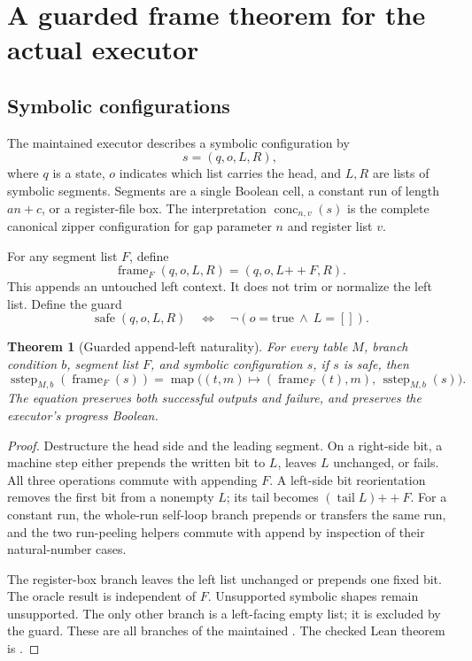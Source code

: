\documentclass[11pt,letterpaper]{article}
\newtheorem{theorem}{Theorem}[section]
\theoremstyle{definition}
\newcommand{\code}[1]{\texttt{\detokenize{#1}}}
\newcommand{\conc}{\operatorname{conc}}
\newcommand{\frameop}{\operatorname{frame}}
\newcommand{\sstep}{\operatorname{sstep}}
\begin{document}
\section{A guarded frame theorem for the actual executor}
\label{sec:frame}

\subsection{Symbolic configurations}

The maintained executor describes a symbolic configuration by
\[
 s=(q,o,L,R),
\]
where $q$ is a state, $o$ indicates which list carries the head, and $L,R$ are
lists of symbolic segments. Segments are a single Boolean cell, a constant
run of length $an+c$, or a register-file box. The interpretation
$\conc_{n,v}(s)$ is the complete canonical zipper configuration for gap
parameter $n$ and register list $v$.

For any segment list $F$, define
\[
 \frameop_F(q,o,L,R)=(q,o,L\mathbin{+\!+}F,R).
\]
This appends an untouched left context. It does not trim or normalize the
left list. Define the guard
\[
 \operatorname{safe}(q,o,L,R)
 \quad\Longleftrightarrow\quad \neg(o=\mathrm{true}\ \wedge\ L=[]).
\]

\begin{theorem}[Guarded append-left naturality]
\label{thm:naturality}
For every table $M$, branch condition $b$, segment list $F$, and symbolic
configuration $s$, if $s$ is safe, then
\[
 \sstep_{M,b}(\frameop_F(s))
 =\operatorname{map}\bigl((t,m)\mapsto(\frameop_F(t),m),\,
                         \sstep_{M,b}(s)\bigr).
\]
The equation preserves both successful outputs and failure, and preserves the
executor's progress Boolean.
\end{theorem}

\begin{proof}
Destructure the head side and the leading segment. On a right-side bit, a
machine step either prepends the written bit to $L$, leaves $L$ unchanged, or
fails. All three operations commute with appending $F$. A left-side bit
reorientation removes the first bit from a nonempty $L$; its tail becomes
$(\operatorname{tail}L)\mathbin{+\!+}F$. For a constant run, the whole-run
self-loop branch prepends or transfers the same run, and the two run-peeling
helpers commute with append by inspection of their natural-number cases.

The register-box branch leaves the left list unchanged or prepends one fixed
bit. The oracle result is independent of $F$. Unsupported symbolic shapes
remain unsupported. The only other branch is a left-facing empty list; it is
excluded by the guard. These are all branches of the maintained \code{sstep}.
The checked Lean theorem is \code{KLeftFrame.sstep_natural}.
\end{proof}
\end{document}
